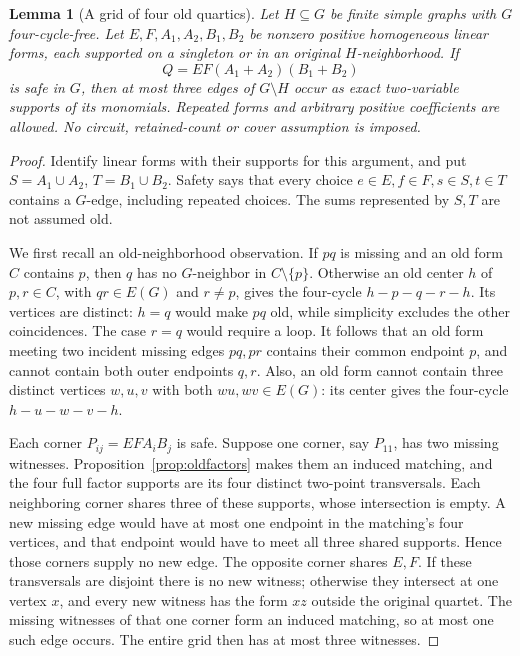 \documentclass[11pt]{article}
\newtheorem{lemma}[theorem]{Lemma}
\theoremstyle{definition}
\theoremstyle{remark}
\begin{document}
\begin{lemma}[A grid of four old quartics]\label{lem:oldquarticgrid}
Let $H\subseteq G$ be finite simple graphs with $G$ four-cycle-free.
Let $E,F,A_1,A_2,B_1,B_2$ be nonzero positive homogeneous linear forms,
each supported on a singleton or in an original $H$-neighborhood.
If
\[
 Q=EF(A_1+A_2)(B_1+B_2)
\]
is safe in $G$, then at most three edges of $G\setminus H$ occur as exact
two-variable supports of its monomials. Repeated forms and arbitrary positive
coefficients are allowed. No circuit, retained-count or cover assumption is
imposed.
\end{lemma}
\begin{proof}
Identify linear forms with their supports for this argument, and put
$S=A_1\cup A_2$, $T=B_1\cup B_2$. Safety says that every choice
$e\in E,f\in F,s\in S,t\in T$ contains a $G$-edge, including repeated
choices. The sums represented by $S,T$ are not assumed old.

We first recall an old-neighborhood observation. If $pq$ is missing and an
old form $C$ contains $p$, then $q$ has no $G$-neighbor in $C\setminus\{p\}$.
Otherwise an old center $h$ of $p,r\in C$, with $qr\in E(G)$ and $r\ne p$,
gives the four-cycle $h-p-q-r-h$. Its vertices are distinct: $h=q$ would
make $pq$ old, while simplicity excludes the other coincidences. The case
$r=q$ would require a loop. It follows that an old form meeting two incident
missing edges $pq,pr$ contains their common endpoint $p$, and cannot contain
both outer endpoints $q,r$. Also, an old form cannot contain three distinct
vertices $w,u,v$ with both $wu,wv\in E(G)$: its center gives the four-cycle
$h-u-w-v-h$.

Each corner $P_{ij}=EFA_iB_j$ is safe. Suppose one corner, say $P_{11}$,
has two missing witnesses. Proposition~\ref{prop:oldfactors} makes them
an induced matching, and the four full factor supports are its four distinct
two-point transversals. Each neighboring corner shares three of these
supports, whose intersection is empty. A new missing edge would have at most
one endpoint in the matching's four vertices, and that endpoint would have
to meet all three shared supports. Hence those corners supply no new edge.
The opposite corner shares $E,F$. If these transversals are disjoint there
is no new witness; otherwise they intersect at one vertex $x$, and every
new witness has the form $xz$ outside the original quartet. The missing
witnesses of that one corner form an induced matching, so at most one such
edge occurs. The entire grid then has at most three witnesses.


\end{proof}
\end{document}
